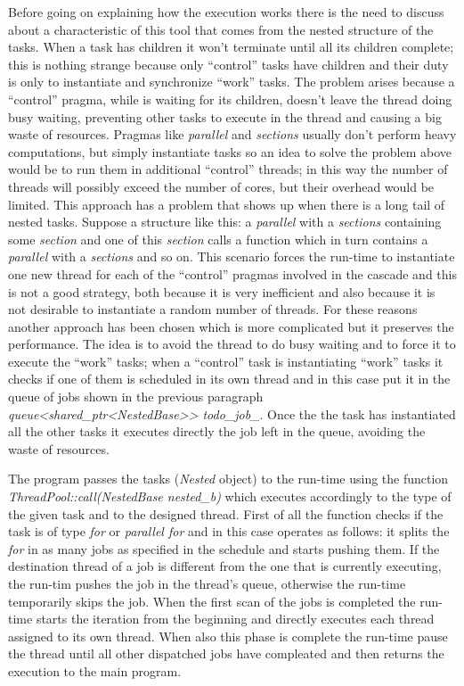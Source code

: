 \documentclass[a4paper,11pt,oneside]{book}
\begin{document}
Before going on explaining how the execution works there is the need to discuss about a characteristic of this tool that comes from the nested structure of the tasks. When a task has children it won’t terminate until all its children complete; this is nothing strange because only “control” tasks have children and their duty is only to instantiate and synchronize “work” tasks. The problem arises because a “control” pragma, while is waiting for its children, doesn’t leave the thread doing busy waiting, preventing other tasks to execute in the thread and causing a big waste of resources. Pragmas like \emph{parallel} and \emph{sections} usually don’t perform heavy computations, but simply instantiate tasks so an idea to solve the problem above would be to run them in additional “control” threads; in this way the number of threads will possibly exceed the number of cores, but their overhead would be limited. This approach has a problem that shows up when there is a long tail of nested tasks. Suppose a structure like this: a \emph{parallel} with a \emph{sections} containing some \emph{section} and one of this \emph{section} calls a function which in turn contains a \emph{parallel} with a \emph{sections} and so on. This scenario forces the run-time to instantiate one new thread for each of the “control” pragmas involved in the cascade and this is not a good strategy, both because it is very inefficient and also because it is not desirable to instantiate a random number of threads. For these reasons another approach has been chosen which is more complicated but it preserves the performance. The idea is to avoid the thread to do busy waiting and to force it to execute the “work” tasks; when a “control” task is instantiating “work” tasks it checks if one of them is scheduled in its own thread and in this case put it in the queue of jobs shown in the previous paragraph \emph{queue<shared\_ptr<NestedBase>> todo\_job\_}. Once the the task has instantiated all the other tasks it executes directly the job left in the queue, avoiding the waste of resources.





The program passes the tasks (\emph{Nested} object) to the run-time using the function \emph{ThreadPool::call(NestedBase nested\_b)} which executes accordingly to the type of the given task and to the designed thread. First of all the function checks if the task is of type \emph{for} or \emph{parallel for} and in this case operates as follows: it splits the \emph{for} in as many jobs as specified in the schedule and starts pushing them. If the destination thread of a job is different from the  one that is currently executing, the run-tim pushes the job in the thread’s queue, otherwise the run-time temporarily skips the job. When the first scan of the jobs is completed the run-time starts the iteration from the beginning and directly executes each thread assigned to its own thread. When also this phase is complete the run-time pause the thread until all other dispatched jobs have compleated and then returns the execution to the main program. 
\end{document}
